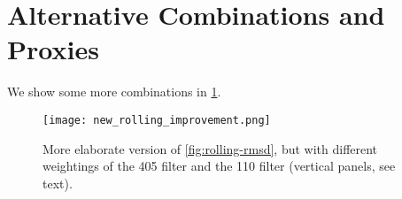 \documentclass[draft]{agujournal2019}
\begin{document}
%
%



%
%
%
%
\appendix

\section{Alternative Combinations and Proxies}

We show some more combinations in \cref{fig:rolling-rmsd-improvement}.

\begin{figure}[htb]
  \centering \texttt{[image: new\_rolling\_improvement.png]}
  \caption{\label{fig:rolling-rmsd-improvement} More elaborate version of \cref{fig:rolling-rmsd}, but with different weightings of the \qty{405}{\kiloyear} filter and the \qty{110}{\kiloyear} filter (vertical panels, see text).}
\end{figure}
\end{document}
